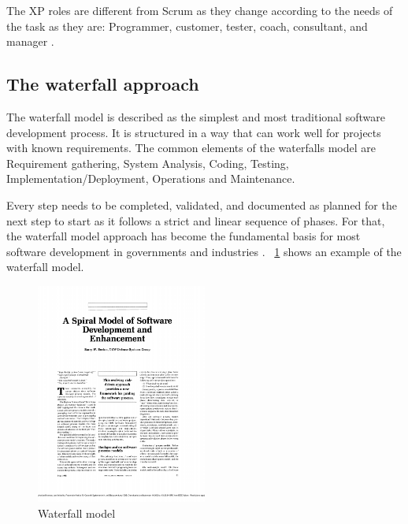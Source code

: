 \documentclass[conference,onecolumn]{IEEEtran}
\begin{document}
The XP roles are different from Scrum as they change according to the needs of the task as they are: Programmer, customer, tester, coach, consultant, and manager \cite{a4}.
 
\subsection{The waterfall approach}
The waterfall model is described as the simplest and most traditional software development process. It is structured in a way that can work well for projects with known requirements. 
The common elements of the waterfalls model are Requirement gathering, System Analysis, Coding, Testing, Implementation/Deployment, Operations and Maintenance.

Every step needs to be completed, validated, and documented as planned for the next step to start as it follows a strict and linear sequence of phases. For that, the waterfall model approach has become the fundamental basis for most software development in governments and industries \cite{a5}.
\figurename~\ref{fig:waterfall} shows an example of the waterfall model.

\begin{figure}[htb]
	\centering
	\includegraphics[width=0.5\textwidth, page=2, clip,trim=4cm 8.5cm 4cm 3cm]{Figures/paper_models.pdf}
	\caption{Waterfall model \cite[p.62]{a6}}
	\label{fig:waterfall}
\end{figure}
\end{document}
